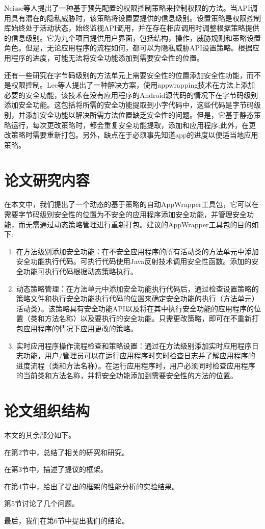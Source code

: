 		Neisse等人提出了一种基于预先配置的权限控制策略来控制权限的方法\cite{Neisse_privacy_2016}。当API调用具有潜在的隐私威胁时，该策略将设置要提供的信息级别。设置策略是权限控制库始终处于活动状态，始终监视API调用，并在存在相应调用时调整根据策略提供的信息级别。它为九个项目提供用户界面，包括结构，操作，威胁规则和策略设置角色。但是，无论应用程序的流程如何，都可以为隐私威胁API设置策略。根据应用程序的进度，可能无法将安全功能添加到需要安全性的位置。

		还有一些研究在字节码级别的方法单元上需要安全性的位置添加安全性功能，而不是权限控制。Lee等人提出了一种解决方案，使用appwrapping技术在方法上添加必要的安全功能，该技术在没有应用程序的Android源代码的情况下在字节码级别添加安全功能\cite{Lee_appwrapping_2017}。这包括将所需的安全功能提取到小字代码中，这些代码是字节码级别，并添加安全功能以解决所需方法位置缺乏安全性的问题。但是，它基于静态策略运行，每次更改策略时，都会重复安全功能提取，添加和应用程序;此外，在更改策略时需要重新打包。另外，缺点在于必须事先知道app的进度以便适当地应用策略。
	
	\section{论文研究内容}
	
		在本文中，我们提出了一个动态的基于策略的自动AppWrapper工具包，它可以在需要字节码级别安全性的位置为不安全的应用程序添加安全功能，并管理安全功能，而无需通过动态策略管理进行重新打包。建议的AppWrapper工具包的目的如下:

		\begin{enumerate}
			\item 在方法级别添加安全功能：在不安全应用程序的所有活动类的方法单元中添加安全功能执行代码。可执行代码使用Java反射技术调用安全性函数。添加的安全功能可执行代码根据动态策略执行。
			\item 动态策略管理：在方法单元中添加安全功能执行代码后，通过检查设置策略的策略文件和执行安全功能执行代码的位置来确定安全功能的执行（方法单元）活动类）。该策略具有安全功能API以及将在其中执行安全功能的应用程序的位置（类和方法名称）以及要执行的安全功能。只需更改策略，即可在不重新打包应用程序的情况下应用更改的策略。
			\item 实时应用程序操作流程检查和策略设置：通过在方法级别添加实时应用程序日志功能，用户/管理员可以在运行应用程序时实时检查日志并了解应用程序的进度流程（类和方法名称）。在运行应用程序时，用户必须同时检查应用程序的当前类和方法名称，并将安全功能添加到需要安全性的方法的位置。
		\end{enumerate}

	\section{论文组织结构}
				
		本文的其余部分如下。
		
		在第2节中，总结了相关的研究和研究。
		
		在第3节中，描述了提议的框架。
		
		在第4节中，给出了提出的框架的性能分析的实验结果。
		
		第5节讨论了几个问题。
		
		最后，我们在第6节中提出我们的结论。